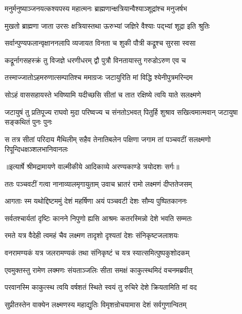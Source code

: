 \twolineshloka
{मनुर्मनुष्याञ्जनयत्कश्यपस्य महात्मनः}
{ब्राह्मणान्क्षत्रियान्वैश्याञ्शूद्रांश्च मनुजर्षभ} %

\twolineshloka
{मुखतो ब्राह्मणा जाता उरसः क्षत्रियास्तथा}
{ऊरुभ्यां जज्ञिरे वैश्याः पद्भ्यां शूद्रा इति श्रुतिः} %

\twolineshloka
{सर्वान्पुण्यफलान्वृक्षाननलापि व्यजायत}
{विनता च शुकी पौत्री कद्रूश्च सुरसा स्वसा} %

\twolineshloka
{कद्रूर्नागसहस्क्रं तु विजज्ञे धरणीधरम्}
{द्वौ पुत्रौ विनतायास्तु गरुडोऽरुण एव च} %

\twolineshloka
{तस्माज्जातोऽहमरुणात्सम्पातिश्च ममाग्रजः}
{जटायुरिति मां विद्धि श्येनीपुत्रमरिन्दम} %

\twolineshloka
{सोऽहं वाससहायस्ते भविष्यामि यदीच्छसि}
{सीतां च तात रक्षिष्ये त्वयि याते सलक्ष्मणे} %

\fourlineindentedshloka
{जटायुषं तु प्रतिपूज्य राघवो}
{मुदा परिष्वज्य च संनतोऽभवत्}
{पितुर्हि शुश्राव सखित्वमात्मवान्}
{जटायुषा सङ्कथितं पुनः पुनः} %

\fourlineindentedshloka
{स तत्र सीतां परिदाय मैथिलीम्}
{सहैव तेनातिबलेन पक्षिणा}
{जगाम तां पञ्चवटीं सलक्ष्मणो}
{रिपून्दिधक्षञ्शलभानिवानलः} %


{॥इत्यार्षे श्रीमद्रामायणे वाल्मीकीये आदिकाव्ये अरण्यकाण्डे त्रयोदशः सर्गः॥}


\twolineshloka
{ततः पञ्चवटीं गत्वा नानाव्यालमृगायुताम्}
{उवाच भ्रातरं रामो लक्ष्मणं दीप्ततेजसम्} %

\twolineshloka
{आगताः स्म यथोद्दिष्टममुं देशं महर्षिणा}
{अयं पञ्चवटी देशः सौम्य पुष्पितकाननः} %

\twolineshloka
{सर्वतश्चार्यतां दृष्टिः कानने निपुणो ह्यसि}
{आश्रमः कतरस्मिन्नो देशे भवति सम्मतः} %

\twolineshloka
{रमते यत्र वैदेही त्वमहं चैव लक्ष्मण}
{तादृशो दृश्यतां देशः संनिकृष्टजलाशयः} %

\twolineshloka
{वनरामण्यकं यत्र जलरामण्यकं तथा}
{संनिकृष्टं च यत्र स्यात्समित्पुष्पकुशोदकम्} %

\twolineshloka
{एवमुक्तस्तु रामेण लक्मणः संयताञ्जलिः}
{सीता समक्षं काकुत्स्थमिदं वचनमब्रवीत्} %

\twolineshloka
{परवानस्मि काकुत्स्थ त्वयि वर्षशतं स्थिते}
{स्वयं तु रुचिरे देशे क्रियतामिति मां वद} %

\twolineshloka
{सुप्रीतस्तेन वाक्येन लक्ष्मणस्य महाद्युतिः}
{विमृशन्रोचयामास देशं सर्वगुणान्वितम्} %

